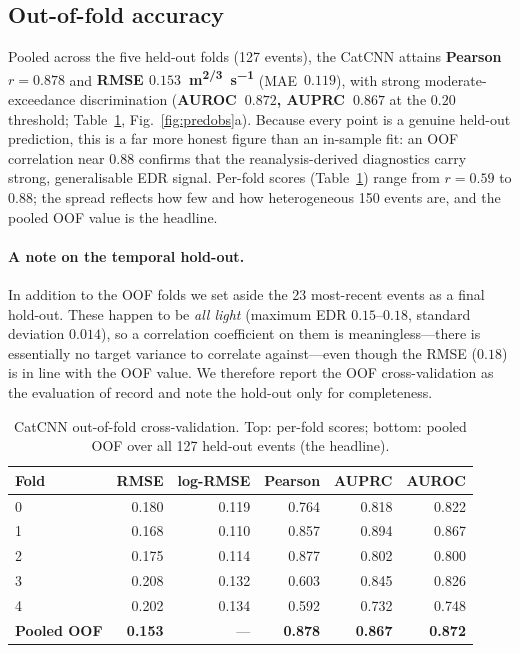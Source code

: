 \documentclass[11pt]{article}
\newcommand{\edrunit}{\si{\metre\tothe{2/3}\per\second}}
\begin{document}
\subsection{Out-of-fold accuracy}
\label{sec:res-acc}
Pooled across the five held-out folds (127 events), the CatCNN attains
\textbf{Pearson $r=0.878$} and \textbf{RMSE $0.153$~\edrunit}
(MAE~$0.119$), with strong moderate-exceedance discrimination
(\textbf{AUROC~$0.872$, AUPRC~$0.867$} at the $0.20$ threshold;
Table~\ref{tab:catcnn}, Fig.~\ref{fig:predobs}a). Because every point is a
genuine held-out prediction, this is a far more honest figure than an
in-sample fit: an OOF correlation near $0.88$ confirms that the
reanalysis-derived diagnostics carry strong, generalisable EDR signal.
Per-fold scores (Table~\ref{tab:catcnn}) range from $r=0.59$ to $0.88$;
the spread reflects how few and how heterogeneous 150 events are, and the
pooled OOF value is the headline.

\paragraph{A note on the temporal hold-out.} In addition to the OOF folds
we set aside the 23 most-recent events as a final hold-out. These happen
to be \emph{all light} (maximum EDR $0.15$--$0.18$, standard deviation
$0.014$), so a correlation coefficient on them is meaningless---there is
essentially no target variance to correlate against---even though the RMSE
($0.18$) is in line with the OOF value. We therefore report the OOF
cross-validation as the evaluation of record and note the hold-out only
for completeness.

\begin{table}[H]
\centering\small
\caption{CatCNN out-of-fold cross-validation. Top: per-fold scores;
bottom: pooled OOF over all 127 held-out events (the headline).}
\label{tab:catcnn}
\begin{tabular}{@{}lrrrrr@{}}
\toprule
Fold & RMSE & log-RMSE & Pearson & AUPRC & AUROC \\
\midrule
0 & 0.180 & 0.119 & 0.764 & 0.818 & 0.822 \\
1 & 0.168 & 0.110 & 0.857 & 0.894 & 0.867 \\
2 & 0.175 & 0.114 & 0.877 & 0.802 & 0.800 \\
3 & 0.208 & 0.132 & 0.603 & 0.845 & 0.826 \\
4 & 0.202 & 0.134 & 0.592 & 0.732 & 0.748 \\
\midrule
\textbf{Pooled OOF} & \textbf{0.153} & --- & \textbf{0.878} & \textbf{0.867} & \textbf{0.872} \\
\bottomrule
\end{tabular}
\end{table}
\end{document}
